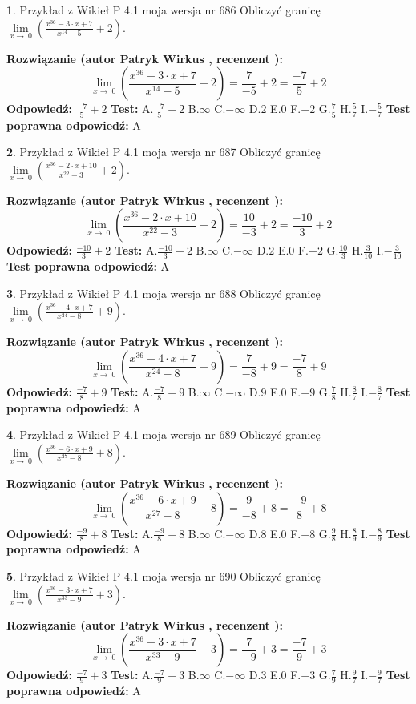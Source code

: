\documentclass[12pt, a4paper]{article}
\theoremstyle{definition} %
\newtheorem{zad}{}
\newcommand{\zadStart}[1]{\begin{zad}#1\newline}
\newcommand{\zadStop}{\end{zad}}
\newcommand{\rozwStart}[2]{\noindent \textbf{Rozwiązanie (autor #1 , recenzent #2): }\newline}
\newcommand{\rozwStop}{\newline}
\newcommand{\odpStart}{\noindent \textbf{Odpowiedź:}\newline}
\newcommand{\odpStop}{\newline}
\newcommand{\testStart}{\noindent \textbf{Test:}\newline}
\newcommand{\testStop}{\newline}
\newcommand{\kluczStart}{\noindent \textbf{Test poprawna odpowiedź:}\newline}
\newcommand{\kluczStop}{\newline}
\begin{document}
\zadStart{Przykład z Wikieł P 4.1 moja wersja nr 686}
Obliczyć granicę $\lim\limits_{x\to\ 0}(\frac{x^{36}-3 \cdot x +7}{x^{14}-5}+2)$.
\zadStop
\rozwStart{Patryk Wirkus}{}
$$\lim\limits_{x\to\ 0}(\frac{x^{36}-3 \cdot x +7}{x^{14}-5}+2)=\frac{7}{-5}+2=\frac{-7}{5}+2$$
\rozwStop
\odpStart
$\frac{-7}{5}+2$
\odpStop
\testStart
A.$\frac{-7}{5}+2$
B.$\infty$
C.$-\infty$
D.$2$
E.$0$
F.$-2$
G.$\frac{7}{5}$
H.$\frac{5}{7}$
I.$-\frac{5}{7}$
\testStop
\kluczStart
A
\kluczStop



\zadStart{Przykład z Wikieł P 4.1 moja wersja nr 687}
Obliczyć granicę $\lim\limits_{x\to\ 0}(\frac{x^{36}-2 \cdot x +10}{x^{22}-3}+2)$.
\zadStop
\rozwStart{Patryk Wirkus}{}
$$\lim\limits_{x\to\ 0}(\frac{x^{36}-2 \cdot x +10}{x^{22}-3}+2)=\frac{10}{-3}+2=\frac{-10}{3}+2$$
\rozwStop
\odpStart
$\frac{-10}{3}+2$
\odpStop
\testStart
A.$\frac{-10}{3}+2$
B.$\infty$
C.$-\infty$
D.$2$
E.$0$
F.$-2$
G.$\frac{10}{3}$
H.$\frac{3}{10}$
I.$-\frac{3}{10}$
\testStop
\kluczStart
A
\kluczStop



\zadStart{Przykład z Wikieł P 4.1 moja wersja nr 688}
Obliczyć granicę $\lim\limits_{x\to\ 0}(\frac{x^{36}-4 \cdot x +7}{x^{24}-8}+9)$.
\zadStop
\rozwStart{Patryk Wirkus}{}
$$\lim\limits_{x\to\ 0}(\frac{x^{36}-4 \cdot x +7}{x^{24}-8}+9)=\frac{7}{-8}+9=\frac{-7}{8}+9$$
\rozwStop
\odpStart
$\frac{-7}{8}+9$
\odpStop
\testStart
A.$\frac{-7}{8}+9$
B.$\infty$
C.$-\infty$
D.$9$
E.$0$
F.$-9$
G.$\frac{7}{8}$
H.$\frac{8}{7}$
I.$-\frac{8}{7}$
\testStop
\kluczStart
A
\kluczStop



\zadStart{Przykład z Wikieł P 4.1 moja wersja nr 689}
Obliczyć granicę $\lim\limits_{x\to\ 0}(\frac{x^{36}-6 \cdot x +9}{x^{27}-8}+8)$.
\zadStop
\rozwStart{Patryk Wirkus}{}
$$\lim\limits_{x\to\ 0}(\frac{x^{36}-6 \cdot x +9}{x^{27}-8}+8)=\frac{9}{-8}+8=\frac{-9}{8}+8$$
\rozwStop
\odpStart
$\frac{-9}{8}+8$
\odpStop
\testStart
A.$\frac{-9}{8}+8$
B.$\infty$
C.$-\infty$
D.$8$
E.$0$
F.$-8$
G.$\frac{9}{8}$
H.$\frac{8}{9}$
I.$-\frac{8}{9}$
\testStop
\kluczStart
A
\kluczStop



\zadStart{Przykład z Wikieł P 4.1 moja wersja nr 690}
Obliczyć granicę $\lim\limits_{x\to\ 0}(\frac{x^{36}-3 \cdot x +7}{x^{33}-9}+3)$.
\zadStop
\rozwStart{Patryk Wirkus}{}
$$\lim\limits_{x\to\ 0}(\frac{x^{36}-3 \cdot x +7}{x^{33}-9}+3)=\frac{7}{-9}+3=\frac{-7}{9}+3$$
\rozwStop
\odpStart
$\frac{-7}{9}+3$
\odpStop
\testStart
A.$\frac{-7}{9}+3$
B.$\infty$
C.$-\infty$
D.$3$
E.$0$
F.$-3$
G.$\frac{7}{9}$
H.$\frac{9}{7}$
I.$-\frac{9}{7}$
\testStop
\kluczStart
A
\kluczStop
\end{document}
